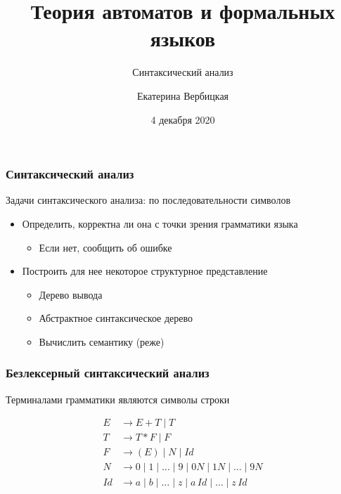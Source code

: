 \documentclass{beamer}
\title[]{Теория автоматов и формальных языков}
\subtitle[]{Синтаксический анализ}
\institute[]{
Санкт-Петербургский государственный электротехнический университет <<ЛЭТИ>>\\
}
\author[]{Екатерина Вербицкая}
\date{4 декабря 2020}
\begin{document}
{
  \begin{frame}
    \titlepage
  \end{frame}
}

\begin{frame}[fragile]
  \frametitle{Синтаксический анализ}
\begin{center}
  Задачи синтаксического анализа: по последовательности символов
\end{center}

  \begin{itemize}
    \item Определить, корректна ли она с точки зрения грамматики языка
    \begin{itemize}
      \item Если нет, сообщить об ошибке
    \end{itemize}
    \item Построить для нее некоторое структурное представление
    \begin{itemize}
      \item Дерево вывода
      \item Абстрактное синтаксическое дерево
      \item Вычислить семантику (реже)
    \end{itemize}
  \end{itemize}
\end{frame}

\begin{frame}[fragile]
  \frametitle{Безлексерный синтаксический анализ}
\begin{center}
  Терминалами грамматики являются символы строки
\end{center}

\begin{align*}
  E &\to E + T \mid T  \\
  T &\to T * F \mid F  \\
  F &\to (E) \mid N \mid Id \\
  N &\to 0 \mid 1 \mid \dots \mid 9 \mid 0N \mid 1N \mid \dots \mid 9N \\
  Id &\to a \mid b \mid \dots \mid z \mid a \, Id \mid \dots \mid z \, Id
\end{align*}
\end{frame}
\end{document}
